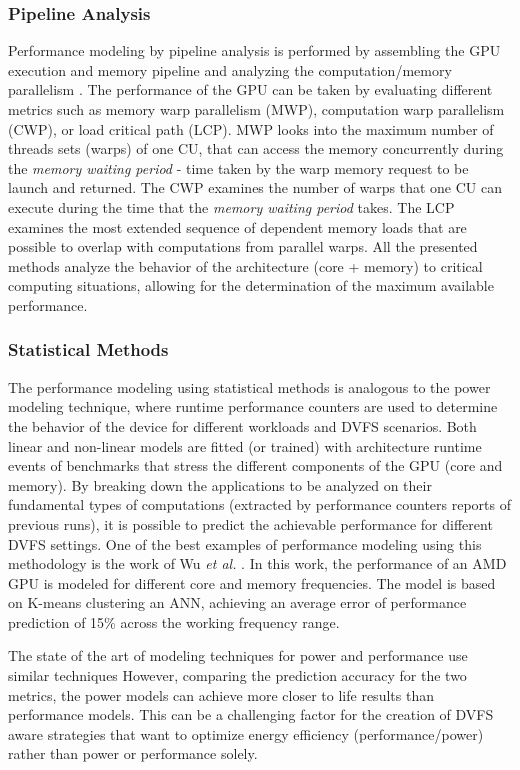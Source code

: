 \subsubsection{Pipeline Analysis}
Performance modeling by pipeline analysis is performed by assembling the GPU execution and memory pipeline and analyzing the computation/memory parallelism \cite{mei_survey_2016}. The performance of the GPU can be taken by evaluating different metrics such as memory warp parallelism (MWP), computation warp parallelism (CWP), or load critical path (LCP). MWP looks into the maximum number of threads sets (warps) of one CU, that can access the memory concurrently during the \textit{memory waiting period} - time taken by the warp memory request to be launch and returned. The CWP examines the number of warps that one CU can execute during the time that the \textit{memory waiting period} takes. The LCP examines the most extended sequence of dependent memory loads that are possible to overlap with computations from parallel warps. All the presented methods analyze the behavior of the architecture (core + memory) to critical computing situations, allowing for the determination of the maximum available performance.

\subsubsection{Statistical Methods}
The performance modeling using statistical methods is analogous to the power modeling technique, where runtime performance counters are used to determine the behavior of the device for different workloads and DVFS scenarios. Both linear and non-linear models are fitted (or trained) with architecture runtime events of benchmarks that stress the different components of the GPU (core and memory). By breaking down the applications to be analyzed on their fundamental types of computations (extracted by performance counters reports of previous runs), it is possible to predict the achievable performance for different DVFS settings. One of the best examples of performance modeling using this methodology is the work of Wu \textit{et al.} \cite{wu_gpgpu_2015}. In this work, the performance of an AMD GPU is modeled for different core and memory frequencies. The model is based on K-means clustering an ANN, achieving an average error of performance prediction of 15\% across the working frequency range.

\bigskip
The state of the art of modeling techniques for power and performance use similar techniques However, comparing the prediction accuracy for the two metrics, the power models can achieve more closer to life results than performance models. This can be a challenging factor for the creation of DVFS aware strategies that want to optimize energy efficiency (performance/power) rather than power or performance solely.

